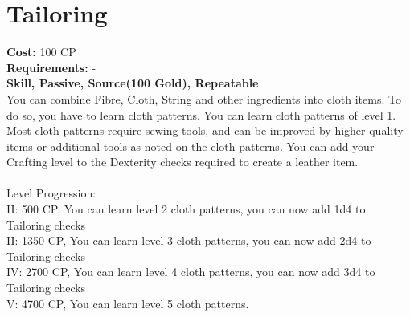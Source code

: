 \section{Tailoring}\label{perk:tailoring}
\textbf{Cost:} 100 CP\\
\textbf{Requirements:} -\\
\textbf{Skill, Passive, Source(100 Gold), Repeatable}\\
You can combine Fibre, Cloth, String and other ingredients into cloth items.
To do so, you have to learn cloth patterns.
You can learn cloth patterns of level 1.
Most cloth patterns require sewing tools, and can be improved by higher quality items or additional tools as noted on the cloth patterns.
You can add your Crafting level to the Dexterity checks required to create a leather item.\\
\\
Level Progression:\\
II: 500 CP, You can learn level 2 cloth patterns, you can now add 1d4 to Tailoring checks\\
II: 1350 CP, You can learn level 3 cloth patterns, you can now add 2d4 to Tailoring checks\\
IV: 2700 CP, You can learn level 4 cloth patterns, you can now add 3d4 to Tailoring checks\\
V: 4700 CP, You can learn level 5 cloth patterns.\\